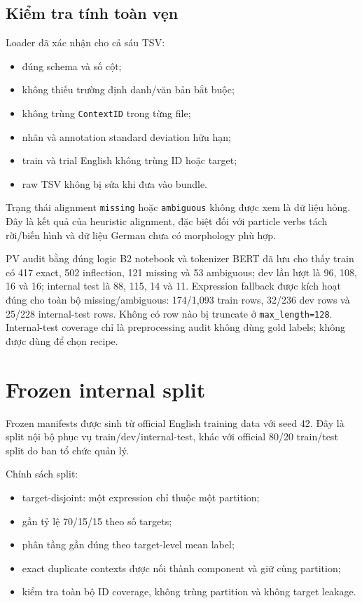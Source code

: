 \documentclass[11pt,a4paper]{article}
\newcommand{\code}[1]{\nolinkurl{#1}}
\begin{document}
\subsection{Kiểm tra tính toàn vẹn}

Loader đã xác nhận cho cả sáu TSV:
\begin{itemize}
  \item đúng schema và số cột;
  \item không thiếu trường định danh/văn bản bắt buộc;
  \item không trùng \code{ContextID} trong từng file;
  \item nhãn và annotation standard deviation hữu hạn;
  \item train và trial English không trùng ID hoặc target;
  \item raw TSV không bị sửa khi đưa vào bundle.
\end{itemize}

Trạng thái alignment \code{missing} hoặc \code{ambiguous} không được xem là dữ liệu hỏng. Đây là kết quả của heuristic alignment, đặc biệt đối với particle verbs tách rời/biến hình và dữ liệu German chưa có morphology phù hợp.

PV audit bằng đúng logic B2 notebook và tokenizer BERT đã lưu cho thấy train có 417 exact, 502 inflection, 121 missing và 53 ambiguous; dev lần lượt là 96, 108, 16 và 16; internal test là 88, 115, 14 và 11. Expression fallback được kích hoạt đúng cho toàn bộ missing/ambiguous: 174/1,093 train rows, 32/236 dev rows và 25/228 internal-test rows. Không có row nào bị truncate ở \code{max_length=128}. Internal-test coverage chỉ là preprocessing audit không dùng gold labels; không được dùng để chọn recipe.

\section{Frozen internal split}

Frozen manifests được sinh từ official English training data với seed 42. Đây là split nội bộ phục vụ train/dev/internal-test, khác với official 80/20 train/test split do ban tổ chức quản lý.

Chính sách split:
\begin{itemize}
  \item target-disjoint: một expression chỉ thuộc một partition;
  \item gần tỷ lệ 70/15/15 theo số targets;
  \item phân tầng gần đúng theo target-level mean label;
  \item exact duplicate contexts được nối thành component và giữ cùng partition;
  \item kiểm tra toàn bộ ID coverage, không trùng partition và không target leakage.
\end{itemize}
\end{document}
